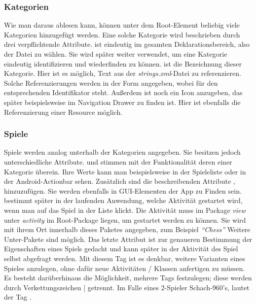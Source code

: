 \subsubsection{Kategorien}
\label{sssec:categories}

Wie man daraus ablesen kann, können unter dem Root-Element  beliebig
viele Kategorien hinzugefügt werden. Eine solche Kategorie wird beschrieben
durch drei verpflichtende Attribute.  ist eindeutig im gesamten
Deklarationsbereich, also der Datei zu wählen. Sie wird später weiter verwendet,
um eine Kategorie eindeutig identifizieren und wiederfinden zu können.
 ist die Bezeichnung dieser Kategorie. Hier ist es möglich, Text aus
der \emph{strings.xml}-Datei zu referenzieren. Solche Referenzierungen werden in
der Form  angegeben, wobei  für den
entsprechenden Identifikator steht. Außerdem ist noch ein Icon anzugeben, das
später beispielsweise im Navigation Drawer zu finden ist. Hier ist ebenfalls die
Referenzierung einer Resource möglich.

\subsubsection{Spiele}
\label{sssec:games}

Spiele werden analog unterhalb der Kategorien angegeben. Sie besitzen jedoch
unterschiedliche Attribute.  und  stimmen mit der
Funktionalität deren einer Kategorie überein. Ihre Werte kann man
beispielsweise in der Spieleliste  oder in
der Android-Actionbar sehen. Zusätzlich sind die beschreibenden Attribute
,  hinzuzufügen. Sie werden ebenfalls in
GUI-Elementen der App zu Finden sein.  bestimmt später in der
laufenden Anwendung, welche Aktivität gestartet wird, wenn man auf das Spiel in
der Liste klickt. Die Aktivität muss im Package \emph{view} unter
\emph{activity} im Root-Package liegen, um gestartet werden zu können. Sie wird
mit ihrem Ort innerhalb dieses Paketes angegeben, zum Beispiel \emph{``Chess''}
Weitere Unter-Pakete sind möglich. Das letzte Attribut  ist zur
genaueren Bestimmung der Eigenschaften eines Spiels gedacht und kann später in
der Aktivität des Spiel selbst abgefragt werden. Mit diesem Tag ist es denkbar,
weitere Varianten eines Spieles anzulegen, ohne dafür neue Aktivitäten
/ Klassen anfertigen zu müssen. Es besteht darüberhinaus die Möglichkeit,
mehrere Tags festzulegen; diese werden durch Verkettungszeichen | getrennt. Im
Falle eines 2-Spieler Schach-960's, lautet der Tag .

